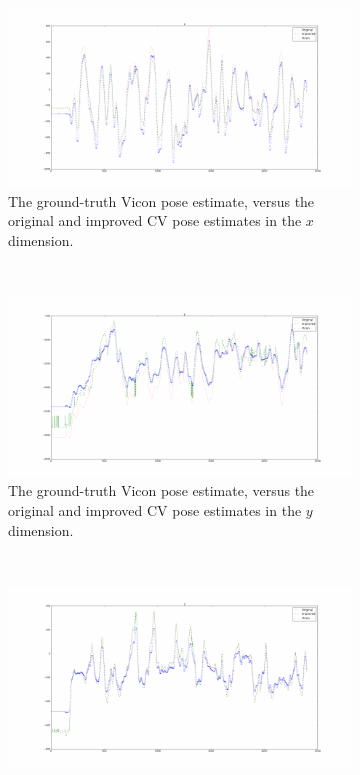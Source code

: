 \begin{figure}
  \begin{subfigure}{0.45\textwidth}
    \includegraphics[width=\textwidth]{figures/chapter3/x}
    \caption{The ground-truth Vicon pose estimate, versus the original and improved CV pose estimates in the $x$ dimension.}
  \label{fig:estimate-x}
  \end{subfigure}
~
  \begin{subfigure}{0.45\textwidth}
    \includegraphics[width=\textwidth]{figures/chapter3/y}
    \caption{The ground-truth Vicon pose estimate, versus the original and improved CV pose estimates in the $y$ dimension.}
  \label{fig:estimate-y}
  \end{subfigure}
~
  \begin{subfigure}{0.45\textwidth}
    \includegraphics[width=\textwidth]{figures/chapter3/z}

\end{subfigure}
\end{figure}
